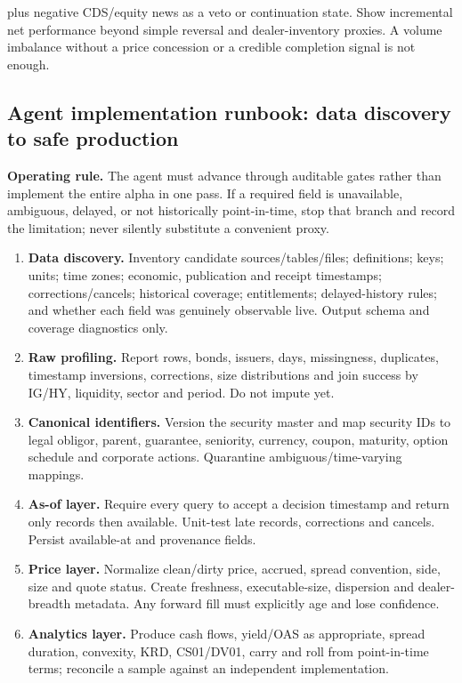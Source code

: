 \documentclass[10pt]{article}
\begin{document}
plus negative CDS/equity news as a veto or continuation state. Show incremental net performance beyond simple reversal and dealer-inventory proxies. A volume imbalance without a price concession or a credible completion signal is not enough.
\subsection{Agent implementation runbook: data discovery to safe production}
\textbf{Operating rule.} The agent must advance through auditable gates rather than implement the entire alpha in one pass. If a required field is unavailable, ambiguous, delayed, or not historically point-in-time, stop that branch and record the limitation; never silently substitute a convenient proxy.
\begin{enumerate}[leftmargin=2em,label=\textbf{A\arabic*.}]
\item \textbf{Data discovery.} Inventory candidate sources/tables/files; definitions; keys; units; time zones; economic, publication and receipt timestamps; corrections/cancels; historical coverage; entitlements; delayed-history rules; and whether each field was genuinely observable live. Output schema and coverage diagnostics only.
\item \textbf{Raw profiling.} Report rows, bonds, issuers, days, missingness, duplicates, timestamp inversions, corrections, size distributions and join success by IG/HY, liquidity, sector and period. Do not impute yet.
\item \textbf{Canonical identifiers.} Version the security master and map security IDs to legal obligor, parent, guarantee, seniority, currency, coupon, maturity, option schedule and corporate actions. Quarantine ambiguous/time-varying mappings.
\item \textbf{As-of layer.} Require every query to accept a decision timestamp and return only records then available. Unit-test late records, corrections and cancels. Persist available-at and provenance fields.
\item \textbf{Price layer.} Normalize clean/dirty price, accrued, spread convention, side, size and quote status. Create freshness, executable-size, dispersion and dealer-breadth metadata. Any forward fill must explicitly age and lose confidence.
\item \textbf{Analytics layer.} Produce cash flows, yield/OAS as appropriate, spread duration, convexity, KRD, CS01/DV01, carry and roll from point-in-time terms; reconcile a sample against an independent implementation.

\end{enumerate}
\end{document}

